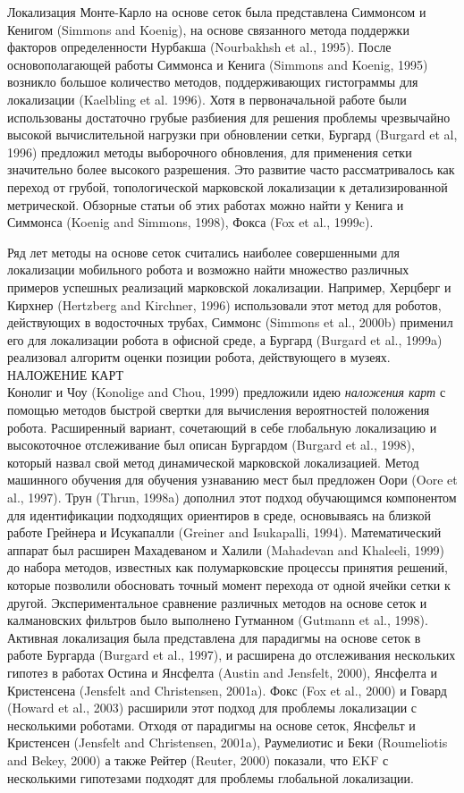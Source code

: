 \documentclass[10pt,a4paper]{article}
\begin{document}
Локализация Монте-Карло на основе сеток была представлена Симмонсом и Кенигом (Simmons and Koenig), на основе связанного метода поддержки факторов определенности Нурбакша (Nourbakhsh et al., 1995). После основополагающей работы Симмонса и Кенига (Simmons and Koenig, 1995) возникло большое количество методов, поддерживающих гистограммы для локализации (Kaelbling et al. 1996). Хотя в первоначальной работе были использованы достаточно грубые разбиения для решения проблемы чрезвычайно высокой вычислительной нагрузки  при обновлении сетки, Бургард (Burgard et al, 1996) предложил методы выборочного обновления, для применения сетки значительно более высокого разрешения. 
Это развитие часто рассматривалось как переход от грубой, топологической марковской локализации к детализированной метрической. Обзорные статьи об этих работах можно найти у Кенига и Симмонса (Koenig and Simmons, 1998), Фокса (Fox et al., 1999c). 

Ряд лет методы на основе сеток считались наиболее совершенными для локализации мобильного робота и возможно найти множество различных примеров успешных реализаций марковской локализации.  Например, Херцберг и Кирхнер (Hertzberg and Kirchner, 1996) использовали этот метод для роботов, действующих в водосточных трубах, Симмонс (Simmons et al., 2000b) применил его для локализации робота в офисной среде, а Бургард (Burgard et al., 1999a) реализовал алгоритм оценки позиции робота, действующего в музеях.\\ 
НАЛОЖЕНИЕ КАРТ\\
Конолиг и Чоу (Konolige and Chou, 1999) предложили идею \textit{наложения карт} с помощью методов быстрой свертки для вычисления вероятностей положения робота. Расширенный вариант, сочетающий в себе глобальную локализацию и высокоточное отслеживание был описан Бургардом (Burgard et al., 1998), который назвал свой метод динамической марковской локализацией. Метод машинного обучения для обучения узнаванию мест был предложен Оори (Oore et al., 1997). Трун (Thrun, 1998a) дополнил этот подход обучающимся компонентом для идентификации подходящих ориентиров в среде, основываясь на близкой работе Грейнера и Исукапалли (Greiner and Isukapalli, 1994). Математический аппарат был расширен Махадеваном и Халили (Mahadevan and Khaleeli, 1999) до набора методов, известных как полумарковские процессы принятия решений, которые позволили обосновать точный момент перехода от одной ячейки сетки к другой. Экспериментальное сравнение различных методов на основе сеток и калмановских фильтров было выполнено Гутманном (Gutmann et al., 1998). Активная локализация была представлена для парадигмы на основе сеток в работе Бургарда (Burgard et al., 1997), и расширена до отслеживания нескольких гипотез в работах Остина и Янсфелта (Austin and Jensfelt, 2000), Янсфелта и Кристенсена (Jensfelt and Christensen, 2001a). Фокс (Fox et al., 2000) и Говард (Howard et al., 2003) расширили этот подход для проблемы локализации с несколькими роботами.
Отходя от парадигмы на основе сеток, Янсфельт и Кристенсен (Jensfelt and Christensen, 2001a), Раумелиотис и Беки (Roumeliotis and Bekey, 2000) а также Рейтер (Reuter, 2000) показали, что EKF с несколькими гипотезами подходят для проблемы глобальной локализации.\\
\end{document}

